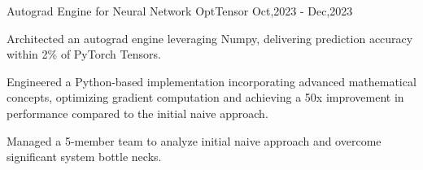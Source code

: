 \cventry
{Autograd Engine for Neural Network} %
{OptTensor \href{https://github.com/giathuan123/mynn}{\faExternalLink*}} %
{ \diPythonPlain \diPytorchPlain} %
{Oct,2023 - Dec,2023} %
{
	\begin{cvitems} %
    \item {Architected an autograd engine leveraging Numpy, delivering prediction accuracy within 2\% of PyTorch Tensors.}
    \item {Engineered a Python-based implementation incorporating advanced mathematical concepts, optimizing gradient computation and achieving a 50x improvement in performance compared to the initial naive approach.}
    \item {Managed a 5-member team to analyze initial naive approach and overcome significant system bottle necks.}
	\end{cvitems}
}
